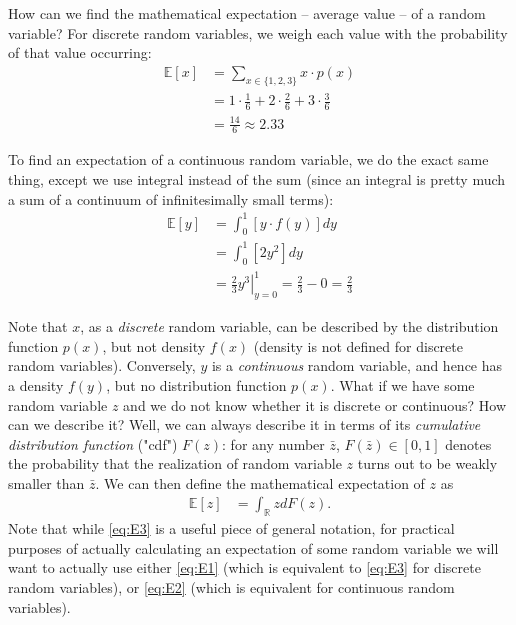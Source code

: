 \documentclass{article}
\begin{document}
How can we find the mathematical expectation -- average value -- of a random variable? For discrete random variables, we weigh each value with the probability of that value occurring:
\begin{align}
	\mathbb{E}[x] &= \sum_{x \in \{1,2,3\}} x \cdot p(x)
	\label{eq:E1}
	\\
	&= 1 \cdot \frac{1}{6} + 2 \cdot \frac{2}{6} + 3 \cdot \frac{3}{6}
	\nonumber
	\\
	&= \frac{14}{6} \approx 2.33
	\nonumber
\end{align}

To find an expectation of a continuous random variable, we do the exact same thing, except we use integral instead of the sum (since an integral is pretty much a sum of a continuum of infinitesimally small terms):
\begin{align}
	\mathbb{E}[y] &= \int_0^1 \left[y \cdot f(y)\right] dy
	\label{eq:E2}
	\\
	&= \int_0^1 \left[2y^2 \right] dy
	\nonumber
	\\
	&= \left. \frac{2}{3} y^3 \right|_{y=0}^{1} = \frac{2}{3} - 0 = \frac{2}{3}
	\nonumber
\end{align}

Note that $x$, as a \emph{discrete} random variable, can be described by the distribution function $p(x)$, but not density $f(x)$ (density is not defined for discrete random variables). Conversely, $y$ is a \emph{continuous} random variable, and hence has a density $f(y)$, but no distribution function $p(x)$. What if we have some random variable $z$ and we do not know whether it is discrete or continuous? How can we describe it? Well, we can always describe it in terms of its \emph{cumulative distribution function} ("cdf") $F(z)$: for any number $\bar{z}$, $F(\bar{z}) \in [0,1]$ denotes the probability that the realization of random variable $z$ turns out to be weakly smaller than $\bar{z}$. We can then define the mathematical expectation of $z$ as
\begin{align}
	\mathbb{E}[z] &= \int_{\mathbb{R}} z dF(z).
	\label{eq:E3}
\end{align}
Note that while \eqref{eq:E3} is a useful piece of general notation, for practical purposes of actually calculating an expectation of some random variable we will want to actually use either \eqref{eq:E1} (which is equivalent to \eqref{eq:E3} for discrete random variables), or \eqref{eq:E2} (which is equivalent for continuous random variables).
\end{document}
